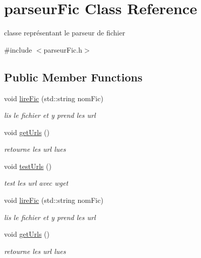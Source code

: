 \hypertarget{classparseur_fic}{\section{parseur\-Fic Class Reference}
\label{classparseur_fic}
}


classe représentant le parseur de fichier  




{\ttfamily \#include $<$parseur\-Fic.\-h$>$}

\subsection*{Public Member Functions}
\begin{DoxyCompactItemize}
\item 
void \hyperlink{classparseur_fic_a450d9c873d69b8bd2dfbaf7f932d7f3d}{lire\-Fic} (std\-::string nom\-Fic)
\begin{DoxyCompactList}\small\item\em lis le fichier et y prend les url \end{DoxyCompactList}\item 
void \hyperlink{classparseur_fic_adc2c9b439a72f44b33d699a2070ed98e}{get\-Urls} ()
\begin{DoxyCompactList}\small\item\em retourne les url lues \end{DoxyCompactList}\item 
void \hyperlink{classparseur_fic_ad2c99c1283f03ac105a2927aa9826021}{test\-Urls} ()
\begin{DoxyCompactList}\small\item\em test les url avec wget \end{DoxyCompactList}\item 
void \hyperlink{classparseur_fic_a450d9c873d69b8bd2dfbaf7f932d7f3d}{lire\-Fic} (std\-::string nom\-Fic)
\begin{DoxyCompactList}\small\item\em lis le fichier et y prend les url \end{DoxyCompactList}\item 
void \hyperlink{classparseur_fic_adc2c9b439a72f44b33d699a2070ed98e}{get\-Urls} ()
\begin{DoxyCompactList}\small\item\em retourne les url lues \end{DoxyCompactList}\end{DoxyCompactItemize}


